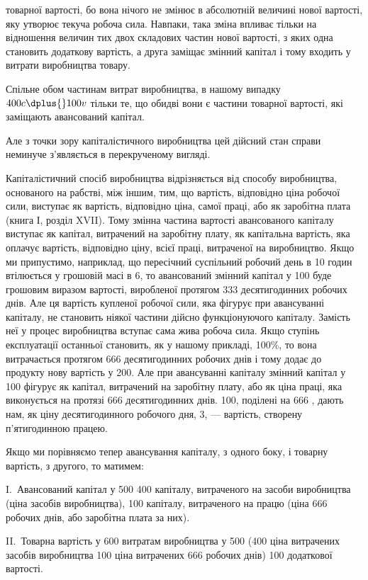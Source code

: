 \parcont{}  %
товарної вартості, бо вона нічого не змінює в абсолютній величині
нової вартості, яку утворює текуча робоча сила. Навпаки,
така зміна впливає тільки на відношення величин тих двох складових
частин нової вартості, з яких одна становить додаткову
вартість, а друга заміщає змінний капітал і тому входить у витрати
виробництва товару.

Спільне обом частинам витрат виробництва, в нашому випадку
$400 c \dplus{} 100v$ тільки те, що обидві вони є частини товарної
вартості, які заміщають авансований капітал.

Але з точки зору капіталістичного виробництва цей дійсний
стан справи неминуче з’являється в перекрученому вигляді.

Капіталістичний спосіб виробництва відрізняється від способу
виробництва, основаного на рабстві, між іншим, тим, що
вартість, відповідно ціна робочої сили, виступає як вартість,
відповідно ціна, самої праці, або як заробітна плата (книга І,
розділ XVII). Тому змінна частина вартості авансованого капіталу
виступає як капітал, витрачений на заробітну плату,
як капітальна вартість, яка оплачує вартість, відповідно ціну,
всієї праці, витраченої на виробництво. Якщо ми припустимо,
наприклад, що пересічний суспільний робочий день в 10 годин
втілюється у грошовій масі в 6, то авансований
змінний капітал у 100 буде грошовим
виразом вартості, виробленої протягом 333 десятигодинних
робочих днів. Але ця вартість купленої робочої сили, яка фігурує
при авансуванні капіталу, не становить ніякої частини
дійсно функціонуючого капіталу. Замість неї у процес виробництва
вступає сама жива робоча сила. Якщо ступінь експлуатації
останньої становить, як у нашому прикладі, 100\%, то вона
витрачається протягом 666 десятигодинних робочих днів і тому
додає до продукту нову вартість у 200. Але
при авансуванні капіталу змінний капітал у 100
фігурує як капітал, витрачений на заробітну плату, або як
ціна праці, яка виконується на протязі 666  десятигодинних
днів. 100, поділені на 666 , дають нам, як
ціну десятигодинного робочого дня, 3, — вартість, створену
п’ятигодинною працею.

Якщо ми порівняємо тепер авансування капіталу, з одного
боку, і товарну вартість, з другого, то матимем:

I.~Авансований капітал у 500 \deq{} 400 капіталу, витраченого на засоби виробництва
(ціна засобів виробництва), \dplus{} 100 капіталу,
витраченого на працю (ціна 666 робочих днів, або заробітна
плата за них).

II.~Товарна вартість у 600 \deq{} витратам виробництва
у 500 (400
ціна витрачених засобів виробництва \dplus{} 100
ціна витрачених 666 робочих днів) \dplus{} 100 додаткової вартості.
